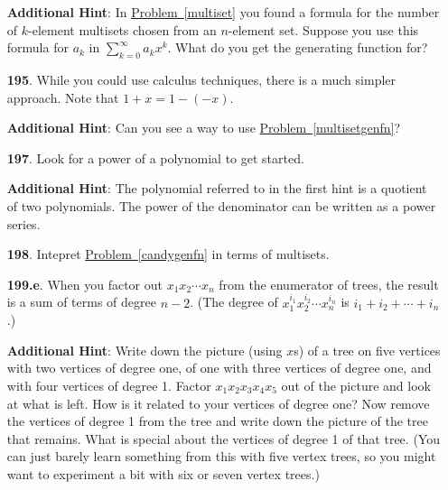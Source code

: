 \documentclass[10pt,]{book}
\theoremstyle{plain}
\theoremstyle{definition}
\theoremstyle{definition}
\numberwithin{equation}{chapter}
\begin{document}
\begin{itemize}[itemsep=1em]
\par\smallskip
\noindent\textbf{Additional Hint}: \hypertarget{p-1102}{}%
In \hyperref[multiset]{Problem~\ref{multiset}} you found a formula for the number of \(k\)-element multisets chosen from an \(n\)-element set. Suppose you use this formula for \(a_k\) in \(\sum_{k=0}^\infty a_kx^k\). What do you get the generating function for?%

\item[\textbf{195}.]\hypertarget{p-1110}{}%
While you could use calculus techniques, there is a much simpler approach. Note that \(1 + x = 1 - (-x)\).%

\par\smallskip
\noindent\textbf{Additional Hint}: \hypertarget{p-1111}{}%
Can you see a way to use \hyperref[multisetgenfn]{Problem~\ref{multisetgenfn}}?%

\item[\textbf{197}.]\hypertarget{p-1116}{}%
Look for a power of a polynomial to get started.%

\par\smallskip
\noindent\textbf{Additional Hint}: \hypertarget{p-1117}{}%
The polynomial referred to in the first hint is a quotient of two polynomials.  The power of the denominator can be written as a power series.%

\item[\textbf{198}.]\hypertarget{p-1121}{}%
Intepret \hyperref[candygenfn]{Problem~\ref{candygenfn}} in terms of multisets.%

\item[\textbf{199.e}.]\hypertarget{p-1133}{}%
When you factor out \(x_1 x_2\cdots x_n\) from the enumerator of trees, the result is a sum of terms of degree \(n - 2\). (The degree of \(x_1^{i_1} x_2^{i_2} \cdots x_n^{i_n}\) is \(i_1 + i_2 + \cdots + i_n\).)%

\par\smallskip
\noindent\textbf{Additional Hint}: \hypertarget{p-1134}{}%
Write down the picture (using \(x\)s) of a tree on five vertices with two vertices of degree one, of one with three vertices of degree one, and with four vertices of degree 1. Factor \(x_1 x_2 x_3 x_4 x_5\) out of the picture and look at what is left.  How is it related to your vertices of degree one? Now remove the vertices of degree 1 from the tree and write down the picture of the tree that remains.  What is special about the vertices of degree 1 of that tree. (You can just barely learn something from this with five vertex trees, so you might want to experiment a bit with six or seven vertex trees.)%


\end{itemize}
\end{document}
